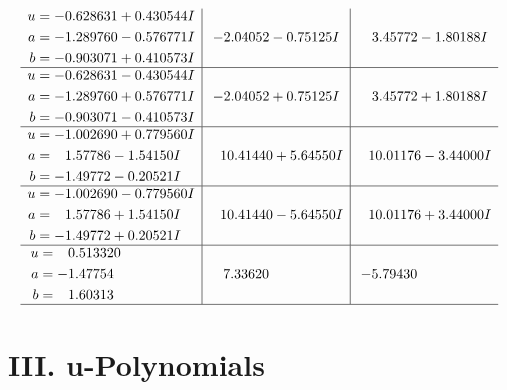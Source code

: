 \documentclass[1p]{elsarticle_modified}
\theoremstyle{definition}
\begin{document}
$$\begin{array}{c|c|c}
\begin{aligned}
u &= -0.628631 + 0.430544 I \\
a &= -1.289760 - 0.576771 I \\
b &= -0.903071 + 0.410573 I\end{aligned}
 & -2.04052 - 0.75125 I & \phantom{-}3.45772 - 1.80188 I \\ \hline\begin{aligned}
u &= -0.628631 - 0.430544 I \\
a &= -1.289760 + 0.576771 I \\
b &= -0.903071 - 0.410573 I\end{aligned}
 & -2.04052 + 0.75125 I & \phantom{-}3.45772 + 1.80188 I \\ \hline\begin{aligned}
u &= -1.002690 + 0.779560 I \\
a &= \phantom{-}1.57786 - 1.54150 I \\
b &= -1.49772 - 0.20521 I\end{aligned}
 & \phantom{-}10.41440 + 5.64550 I & \phantom{-}10.01176 - 3.44000 I \\ \hline\begin{aligned}
u &= -1.002690 - 0.779560 I \\
a &= \phantom{-}1.57786 + 1.54150 I \\
b &= -1.49772 + 0.20521 I\end{aligned}
 & \phantom{-}10.41440 - 5.64550 I & \phantom{-}10.01176 + 3.44000 I \\ \hline\begin{aligned}
u &= \phantom{-}0.513320\phantom{ +0.000000I} \\
a &= -1.47754\phantom{ +0.000000I} \\
b &= \phantom{-}1.60313\phantom{ +0.000000I}\end{aligned}
 & \phantom{-}7.33620\phantom{ +0.000000I} & -5.79430\phantom{ +0.000000I}\\
 \hline 
 \end{array}$$\newpage
\newpage\renewcommand{\arraystretch}{1}
\centering \section*{ III. u-Polynomials}
\end{document}

